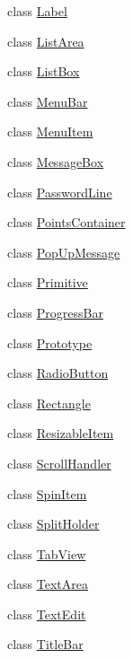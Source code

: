 \begin{DoxyCompactItemize}
class \mbox{\hyperlink{class_space_v_i_l_1_1_label}{Label}}
\item 
class \mbox{\hyperlink{class_space_v_i_l_1_1_list_area}{List\+Area}}
\item 
class \mbox{\hyperlink{class_space_v_i_l_1_1_list_box}{List\+Box}}
\item 
class \mbox{\hyperlink{class_space_v_i_l_1_1_menu_bar}{Menu\+Bar}}
\item 
class \mbox{\hyperlink{class_space_v_i_l_1_1_menu_item}{Menu\+Item}}
\item 
class \mbox{\hyperlink{class_space_v_i_l_1_1_message_box}{Message\+Box}}
\item 
class \mbox{\hyperlink{class_space_v_i_l_1_1_password_line}{Password\+Line}}
\item 
class \mbox{\hyperlink{class_space_v_i_l_1_1_points_container}{Points\+Container}}
\item 
class \mbox{\hyperlink{class_space_v_i_l_1_1_pop_up_message}{Pop\+Up\+Message}}
\item 
class \mbox{\hyperlink{class_space_v_i_l_1_1_primitive}{Primitive}}
\item 
class \mbox{\hyperlink{class_space_v_i_l_1_1_progress_bar}{Progress\+Bar}}
\item 
class \mbox{\hyperlink{class_space_v_i_l_1_1_prototype}{Prototype}}
\item 
class \mbox{\hyperlink{class_space_v_i_l_1_1_radio_button}{Radio\+Button}}
\item 
class \mbox{\hyperlink{class_space_v_i_l_1_1_rectangle}{Rectangle}}
\item 
class \mbox{\hyperlink{class_space_v_i_l_1_1_resizable_item}{Resizable\+Item}}
\item 
class \mbox{\hyperlink{class_space_v_i_l_1_1_scroll_handler}{Scroll\+Handler}}
\item 
class \mbox{\hyperlink{class_space_v_i_l_1_1_spin_item}{Spin\+Item}}
\item 
class \mbox{\hyperlink{class_space_v_i_l_1_1_split_holder}{Split\+Holder}}
\item 
class \mbox{\hyperlink{class_space_v_i_l_1_1_tab_view}{Tab\+View}}
\item 
class \mbox{\hyperlink{class_space_v_i_l_1_1_text_area}{Text\+Area}}
\item 
class \mbox{\hyperlink{class_space_v_i_l_1_1_text_edit}{Text\+Edit}}
\item 
class \mbox{\hyperlink{class_space_v_i_l_1_1_title_bar}{Title\+Bar}}
\item 

\end{DoxyCompactItemize}

